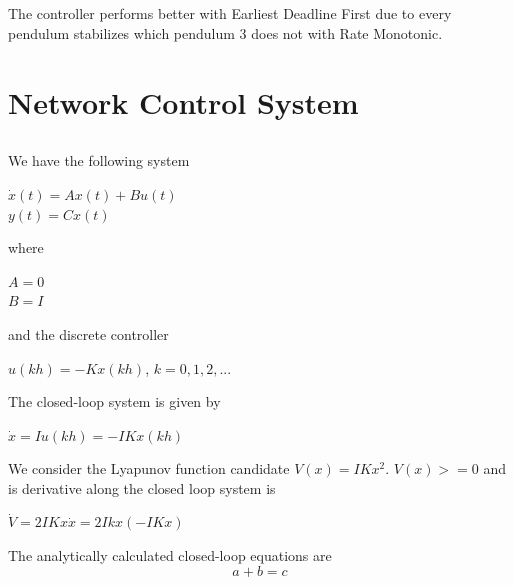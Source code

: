 \documentclass[12pt,a4paper]{article}
\begin{document}
\subsection{}
The controller performs better with Earliest Deadline First due to every pendulum stabilizes which pendulum 3 does not with Rate Monotonic. 

\section{Network Control System}
\subsection{} %
We have the following system
\begin{center}

$\dot{x}(t) = Ax(t)+Bu(t)$ \\
$y(t) = Cx(t)$
\end{center}
where
\begin{center}
$A=0$ \\
$B=I$
\end{center}
and the discrete controller
\begin{center}
$u(kh) = -Kx(kh)$,    $k = 0,1,2,...$
\end{center}

The closed-loop system is given by
\begin{center}
$\dot{x} = Iu(kh)= -IKx(kh)$
\end{center}
We consider the Lyapunov function candidate $V(x)=IKx^2$. $V(x) >=0$ and is derivative along the closed loop system is
\begin{center}
$\dot{V}=2IKx\dot{x}=2Ikx(-IKx)$
\end{center}

The analytically calculated closed-loop equations are
\begin{equation}
a+b=c
\end{equation}
\end{document}
